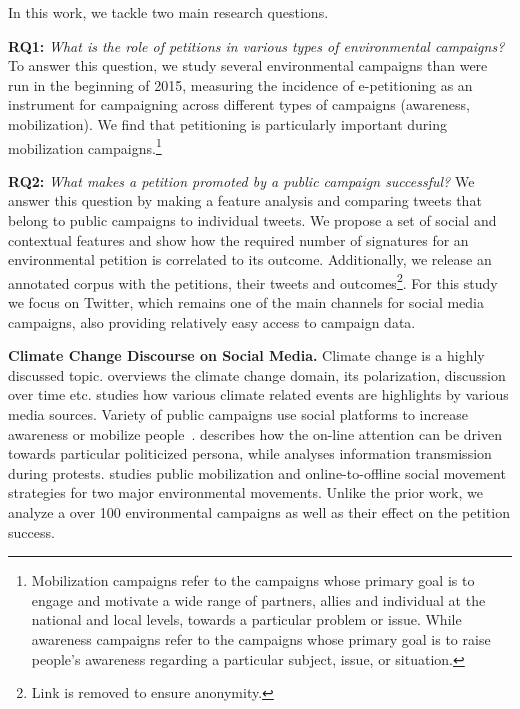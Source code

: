 In this work, we tackle two main research questions.

\textbf{RQ1:} \textit{What is the role of petitions in various types of environmental campaigns?}
To answer this question, we study several environmental campaigns than were run in the beginning of 2015, measuring the incidence of e-petitioning as an instrument for campaigning across different types of campaigns (awareness, mobilization). We find that petitioning is particularly important during mobilization campaigns.\footnote{Mobilization campaigns refer to the campaigns whose primary goal is to engage and motivate a wide range of partners, allies and individual at the national and local levels, towards a particular problem or issue. While awareness campaigns refer to the campaigns whose primary goal is to raise people’s awareness regarding a particular subject, issue, or situation.}

\textbf{RQ2:} \textit{What makes a petition promoted by a public campaign successful?} We answer this question by making a feature analysis and comparing tweets that belong to public campaigns to individual tweets. 
%
We propose a set of social and contextual features and show how the required number of signatures for an environmental petition is  correlated to its outcome.
Additionally, we release an annotated corpus with the petitions, their tweets and outcomes\footnote{Link is removed to ensure anonymity.}.
For this study we focus on Twitter, which remains one of the main channels for social media campaigns, also providing relatively easy access to campaign data.

\textbf{Climate Change Discourse on Social Media.} Climate change is a highly discussed topic. \cite{Kirilenko2014} overviews the climate change domain, its polarization, discussion over time etc. \cite{Olteanu2015} studies how various climate related events are highlights by various media sources.
Variety of public campaigns use social platforms to increase awareness or mobilize people~\cite{Mahmud2014}.
\cite{Tufekci2013} describes how the on-line attention can be driven towards particular politicized persona, while \cite{gonzalez2013networked} analyses information transmission during protests.
\cite{hestres2013preaching} studies public mobilization and online-to-offline social movement strategies for two major environmental movements. Unlike the prior work, we analyze a over 100 environmental campaigns as well as their effect on the petition success.

